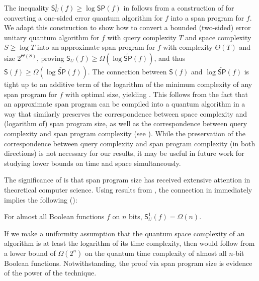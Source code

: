 \documentclass{toc}
\begin{document}
The inequality $\mathsf{S}_U^1(f)\geq\log\mathsf{SP}(f)$ in  follows from a construction of \cite{Rei09} for converting a one-sided error quantum algorithm for $f$ into a span program for $f$. We adapt this construction to show how to convert a bounded (two-sided) error unitary quantum algorithm for $f$ with query complexity $T$ and space complexity $S\geq \log T$ into an approximate span program for $f$ with complexity $\Theta(T)$ and size $2^{\Theta(S)}$, proving $\mathsf{S}_U(f)\geq \Omega(\log\widetilde{\mathsf{SP}}(f))$, and thus $\mathsf{S}(f)\geq \Omega(\log\widetilde{\mathsf{SP}}(f))$. The connection between $\mathsf{S}(f)$ and $\log\widetilde{\mathsf{SP}}(f)$ is tight up to an additive term of the logarithm of the minimum complexity of any span program for $f$ with optimal size, yielding . This follows from the fact that an approximate span program can be compiled into a quantum algorithm in a way that similarly preserves the correspondence between space complexity and (logarithm of) span program size, as well as the correspondence between query complexity and span program complexity (see ). While the preservation of the correspondence between query complexity and span program complexity (in both directions) is not necessary for our results, it may be useful in future work for studying lower bounds on time and space simultaneously.



The significance of  is that span program size has received extensive attention in theoretical computer science. Using results from \cite{BGW99}, the connection in  immediately implies the following ():
\begin{theorem}\label{thm:almost-all-informal}
For almost all Boolean functions $f$ on $n$ bits, $\mathsf{S}_U^1(f)=\Omega({n})$. 
\end{theorem}
If we make a uniformity assumption that the quantum space complexity of an algorithm is at least the logarithm of its time complexity, then  would follow from a lower bound of $\Omega(2^n)$ on the quantum time complexity of almost all $n$-bit Boolean functions. Notwithstanding, the proof via span program size is evidence of the power of the technique. 
\end{document}
